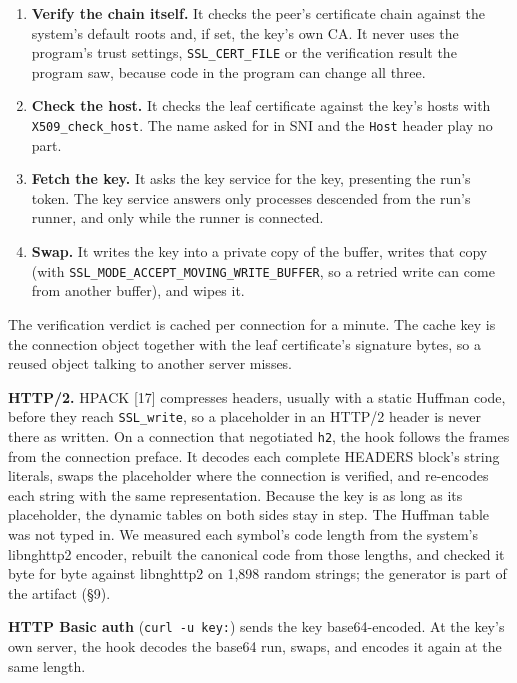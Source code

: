 \documentclass[
  11pt]{article}
\providecommand{\tightlist}{%
  \setlength{\itemsep}{0pt}\setlength{\parskip}{0pt}}
\begin{document}
\begin{enumerate}
\def\labelenumi{\arabic{enumi}.}
\tightlist
\item
  \textbf{Verify the chain itself.} It
  checks the peer's certificate chain
  against the system's default roots
  and, if set, the key's own CA. It
  never uses the program's trust
  settings, \texttt{SSL\_CERT\_FILE} or
  the verification result the program
  saw, because code in the program can
  change all three.
\item
  \textbf{Check the host.} It checks the
  leaf certificate against the key's
  hosts with \texttt{X509\_check\_host}.
  The name asked for in SNI and the
  \texttt{Host} header play no part.
\item
  \textbf{Fetch the key.} It asks the
  key service for the key, presenting
  the run's token. The key service
  answers only processes descended from
  the run's runner, and only while the
  runner is connected.
\item
  \textbf{Swap.} It writes the key into
  a private copy of the buffer, writes
  that copy (with
  \texttt{SSL\_MODE\_ACCEPT\_MOVING\_WRITE\_BUFFER},
  so a retried write can come from
  another buffer), and wipes it.
\end{enumerate}

The verification verdict is cached per
connection for a minute. The cache key
is the connection object together with
the leaf certificate's signature bytes,
so a reused object talking to another
server misses.

\textbf{HTTP/2.} HPACK {[}17{]}
compresses headers, usually with a
static Huffman code, before they reach
\texttt{SSL\_write}, so a placeholder in
an HTTP/2 header is never there as
written. On a connection that negotiated
\texttt{h2}, the hook follows the frames
from the connection preface. It decodes
each complete HEADERS block's string
literals, swaps the placeholder where
the connection is verified, and
re-encodes each string with the same
representation. Because the key is as
long as its placeholder, the dynamic
tables on both sides stay in step. The
Huffman table was not typed in. We
measured each symbol's code length from
the system's libnghttp2 encoder, rebuilt
the canonical code from those lengths,
and checked it byte for byte against
libnghttp2 on 1,898 random strings; the
generator is part of the artifact (§9).

\textbf{HTTP Basic auth}
(\texttt{curl\ -u\ key:}) sends the key
base64-encoded. At the key's own server,
the hook decodes the base64 run, swaps,
and encodes it again at the same length.
\end{document}

